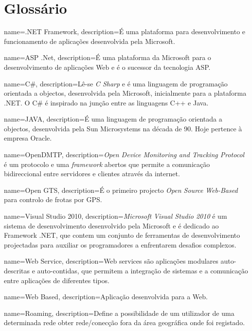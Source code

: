 \chapter*{Glossário}
\makeglossaries

{
  name={.NET Framework},
  description={É uma plataforma para desenvolvimento e funcionamento de aplicações desenvolvida pela Microsoft.}
}

{
  name={ASP .Net},
  description={É uma plataforma da Microsoft para o desenvolvimento de aplicações Web e é o sucessor da tecnologia ASP.}
}

{
  name={C\#},
  description={Lê-se \textit{C Sharp} e é uma linguagem de programação orientada a objectos, desenvolvida pela Microsoft, inicialmente para a plataforma .NET. O C\# é inspirado na junção entre as linguagens C++ e Java.}
}


{
  name={JAVA},
  description={É uma linguagem de programação orientada a objectos, desenvolvida pela Sun Microsystems na década de 90. Hoje pertence à empresa Oracle.}
}


{
  name={OpenDMTP},
  description={\textit{Open Device Monitoring and Tracking Protocol} é um protocolo e uma \textit{framework} abertos que permite a comunicação bidireccional entre servidores e clientes através da internet.}
}


{
  name={Open GTS},
  description={É o primeiro projecto \textit{Open Source} \textit{Web-Based} para controlo de frotas por GPS.}
}


{
  name={Visual Studio 2010},
  description={\textit{Microsoft Visual Studio 2010} é um sistema de desenvolvimento desenvolvido pela Microsoft e é dedicado ao Framework .NET, que contem um conjunto de ferramentas de desenvolvimento projectadas para auxiliar os programadores a enfrentarem desafios complexos.}
}


{
	name={Web Service},
	description={Web services são aplicações modulares auto-descritas e auto-contidas, que permitem a integração de sistemas e a comunicação entre aplicações de diferentes tipos.}
}


{
	name={Web Based},
	description={Aplicação desenvolvida para a Web.}
}

{
	name={Roaming},
	description={Define a possibilidade de um utilizador de uma determinada rede obter rede/conecção fora da área geográfica onde foi registado.}
}


